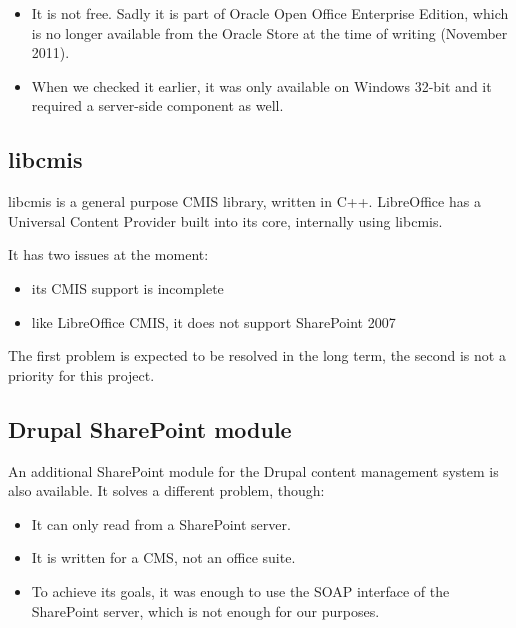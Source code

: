 \begin{itemize}
\item It is not free. Sadly it is part of Oracle Open Office Enterprise
Edition, which is no longer available from the Oracle Store at the time of
writing (November 2011).
\item When we checked it earlier, it was only available on Windows 32-bit and it
required a server-side component as well.
\end{itemize}

\subsection*{libcmis}
libcmis \cite{libcmis} is a general purpose CMIS library, written in C++.
LibreOffice has a Universal Content Provider built into its core,
internally using libcmis.

It has two issues at the moment:

\begin{itemize}
\item its CMIS support is incomplete
\item like LibreOffice CMIS, it does not support SharePoint 2007
\end{itemize}

The first problem is expected to be resolved in the long term, the second is
not a priority for this project.

\subsection*{Drupal SharePoint module}

An additional SharePoint module \cite{drupal-sp} for the Drupal content management system is also available. It solves a different problem, though:

\begin{itemize}
\item It can only read from a SharePoint server.
\item It is written for a CMS, not an office suite.
\item To achieve its goals, it was enough to use the SOAP interface of the
SharePoint server, which is not enough for our purposes.
\end{itemize}

